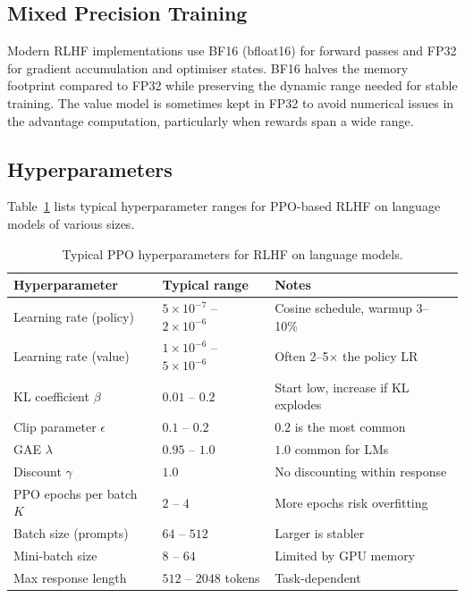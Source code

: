 \subsection{Mixed Precision Training}

Modern RLHF implementations use BF16 (bfloat16) for forward passes and FP32 for gradient accumulation and optimiser states. BF16 halves the memory footprint compared to FP32 while preserving the dynamic range needed for stable training. The value model is sometimes kept in FP32 to avoid numerical issues in the advantage computation, particularly when rewards span a wide range.

\subsection{Hyperparameters}
\label{sec:ppo-hyperparams}

Table~\ref{tab:ppo-hyperparams} lists typical hyperparameter ranges for PPO-based RLHF on language models of various sizes.

\begin{table}[ht]
\centering
{\footnotesize
\begin{tabular}{@{}lll@{}}
\toprule
\textbf{Hyperparameter} & \textbf{Typical range} & \textbf{Notes} \\
\midrule
Learning rate (policy) & $5 \times 10^{-7}$ -- $2 \times 10^{-6}$ & Cosine schedule, warmup 3--10\% \\
Learning rate (value)  & $1 \times 10^{-6}$ -- $5 \times 10^{-6}$ & Often 2--5$\times$ the policy LR \\
KL coefficient $\beta$ & $0.01$ -- $0.2$ & Start low, increase if KL explodes \\
Clip parameter $\epsilon$ & $0.1$ -- $0.2$ & $0.2$ is the most common \\
GAE $\lambda$ & $0.95$ -- $1.0$ & $1.0$ common for LMs \\
Discount $\gamma$ & $1.0$ & No discounting within response \\
PPO epochs per batch $K$ & $2$ -- $4$ & More epochs risk overfitting \\
Batch size (prompts) & $64$ -- $512$ & Larger is stabler \\
Mini-batch size & $8$ -- $64$ & Limited by GPU memory \\
Max response length & $512$ -- $2048$ tokens & Task-dependent \\
\bottomrule
\end{tabular}
}
\caption{Typical PPO hyperparameters for RLHF on language models.}
\label{tab:ppo-hyperparams}
\end{table}

